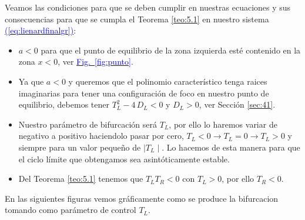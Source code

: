 \documentclass[12pt,a4paper]{report} %
\newcommand{\fref}[1]{\hyperref[#1]{\textcolor{blue}{Fig.~\ref*{#1}}}}
\newcommand{\eref}[1]{\hyperref[#1]{\textcolor{blue}{(\ref*{#1})}}}
\begin{document}
	Veamos las condiciones para que se deben cumplir en nuestras ecuaciones y sus consecuencias para que se cumpla el Teorema \ref{teo:5.1} en nuestro sistema \eref{eq:lienardfinalgr}:
		\begin{itemize}
			\item $a<0$ para que el punto de equilibrio de la zona izquierda esté contenido en la zona $x<0$, ver \fref{fig:punto}.
			\item Ya que $a<0$ y queremos que el polinomio característico  tenga raices imaginarias para tener una configuración de foco en nuestro punto de equilibrio, debemos tener $T_L^2-4\,D_L<0$ y $D_L>0$, ver Sección \ref{sec:41}.

			\item Nuestro parámetro de bifurcación será $T_L$, por ello lo haremos variar de negativo a positivo haciendolo pasar por cero, $T_L<0 \rightarrow T_L=0 \rightarrow T_L>0$ y siempre para un valor pequeño de $\mid T_L \mid$. Lo hacemos de esta manera para que el ciclo límite que obtengamos sea asintóticamente estable.
			\item Del Teorema \ref{teo:5.1} tenemos que $T_LT_R<0$ con $T_L>0$, por ello  $T_R<0$.
		\end{itemize}
		
		
	\vspace{0.5cm} En las siguientes figuras vemos gráficamente como se produce la bifurcacion tomando como parámetro de control $T_L$.
		
	\newpage
	
\end{document}
